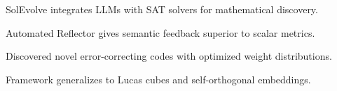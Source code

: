 \begin{highlights}
\item SolEvolve integrates LLMs with SAT solvers for mathematical discovery.
\item Automated Reflector gives semantic feedback superior to scalar metrics.
\item Discovered novel error-correcting codes with optimized weight distributions.
\item Framework generalizes to Lucas cubes and self-orthogonal embeddings.
\end{highlights}
